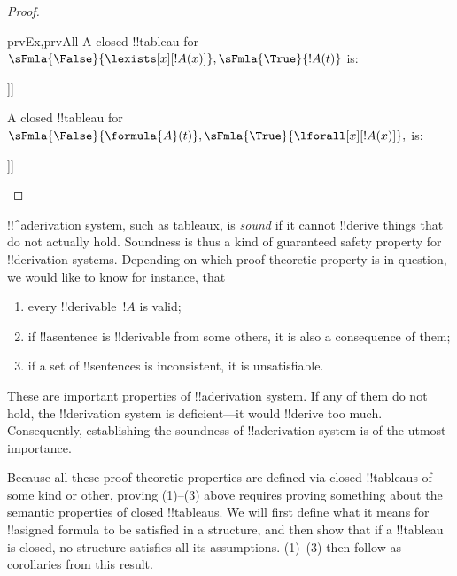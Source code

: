 \begin{proof}
\begin{tagenumerate}{prvEx,prvAll}
A closed !!{tableau} for
  $\sFmla{\False}{\lexists[x][!A(x)]}, \sFmla{\True}{!A(t)}$ is:
  \begin{oltableau}
    [\sFmla{\False}{\lexists[x][\formula{A}(x)]}, just = \TAss
      [\sFmla{\True}{\formula{A}(t)}, just = \TAss
        [\sFmla{\False}{\formula{A}(t)}, just = {\TRule{\False}{\lexists}[1]}, close]]]
    \end{oltableau}
A closed !!{tableau} for
  $\sFmla{\False}{\formula{A}(t)}, \sFmla{\True}{\lforall[x][!A(x)]}, $ is:
  \begin{oltableau}
    [\sFmla{\False}{\formula{A}(t)}, just = \TAss
      [\sFmla{\True}{\lforall[x][\formula{A}(x)]}, just = \TAss
        [\sFmla{\True}{\formula{A}(t)}, just = {\TRule{\True}{\lforall}[2]}, close]]]
    \end{oltableau}
\end{tagenumerate}
\end{proof}






      

\begin{explain}
!!^a{derivation} system, such as tableaux, is \emph{sound}
if it cannot !!{derive} things that do not actually hold.  Soundness is
thus a kind of guaranteed safety property for !!{derivation} systems.
Depending on which proof theoretic property is in question, we would
like to know for instance, that
\begin{enumerate}
\item every !!{derivable}~$!A$ is valid;
\item if !!a{sentence} is !!{derivable} from some others, it is also a
  consequence of them;
\item if a set of !!{sentence}s is inconsistent, it is unsatisfiable.
\end{enumerate}
These are important properties of !!a{derivation} system.  If any of them do
not hold, the !!{derivation} system is deficient---it would !!{derive} too much.
Consequently, establishing the soundness of !!a{derivation} system is of the
utmost importance.

Because all these proof-theoretic properties are defined via closed
!!{tableau}s of some kind or other, proving (1)--(3) above requires
proving something about the semantic properties of closed
!!{tableau}s.  We will first define what it means for !!a{signed
  formula} to be satisfied in a structure, and then show that if a
!!{tableau} is closed, no structure satisfies all its assumptions.
(1)--(3) then follow as corollaries from this result.
\end{explain}

